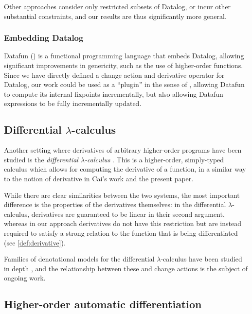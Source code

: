 Other approaches \autocites{dong2000incremental}{urpi1992method} consider only
restricted subsets of Datalog, or incur other substantial constraints, and our results
are thus significantly more general.

\subsubsection{Embedding Datalog}
\label{sec:embeddingDatalog}

Datafun (\textcite{arntz2016datafun}) is a functional programming language that embeds
Datalog, allowing significant improvements in genericity, such as the use of
higher-order functions. Since we have directly defined a change action and
derivative operator for Datalog, our work could be used as a ``plugin'' in the sense
of \citeauthor{cai2014changes}, allowing Datafun to compute its internal fixpoints
incrementally, but also allowing Datafun expressions to be fully incrementally updated.

\subsection{Differential $\lambda$-calculus}

Another setting where derivatives of arbitrary higher-order programs have been studied
is the \emph{differential $\lambda$-calculus} \autocites{ehrhard2003differential}{ehrhard2017introduction}.
This is a higher-order, simply-typed
calculus which allows for computing the derivative of a function, in a similar
way to the notion of derivative in Cai's work and the present paper.

While there are clear similarities between the two systems, 
the most important difference is the properties of the derivatives themselves:
in the differential $\lambda$-calculus, derivatives are guaranteed to be linear
in their second argument, whereas in our approach derivatives do not have this restriction 
but are instead required to satisfy a strong relation to the function
that is being differentiated (see \cref{def:derivative}).

Families of denotational models for the differential $\lambda$-calculus have been
studied in depth
\autocites{bucciarelli2010categorical}{blute2010convenient}{cockett2016categorical}{kerjean2016mackey},
and the relationship between these and change actions is the subject of ongoing work.

\subsection{Higher-order automatic differentiation}

